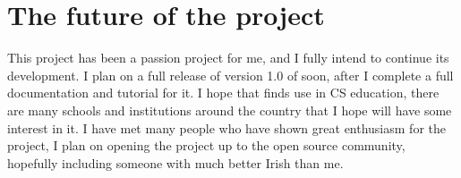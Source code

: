 \section{The future of the project}

This project has been a passion project for me, and I fully intend to continue its development. I plan on a full release of version 1.0 of \Setanta{} soon, after I complete a full documentation and tutorial for it.
I hope that \Setanta{} finds use in CS education, there are many schools and institutions around the country that I hope will have some interest in it. I have met many people who have shown great enthusiasm for the project, I plan on opening the project up to the open source community, hopefully including someone with much better Irish than me.
